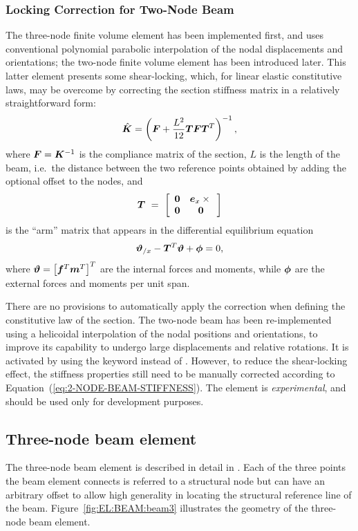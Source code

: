 \subsubsection{Locking Correction for Two-Node Beam}
The three-node finite volume element has been implemented first, 
and uses conventional polynomial parabolic interpolation 
of the nodal displacements and orientations;
the two-node finite volume element has been introduced later.
This latter element presents some shear-locking, which, for linear elastic
constitutive laws, may be overcome by correcting the section stiffness matrix
in a relatively straightforward form:
\begin{equation}\label{eq:2-NODE-BEAM-STIFFNESS}
	\hat{\T{K}} = \plbr{\T{F} + \frac{L^2}{12}\T{T} \T{F} \T{T}^T}^{-1} ,
\end{equation}
where $\T{F}=\T{K}^{-1}$ is the compliance matrix of the section, 
$L$ is the length of the beam, i.e.\ the distance between
the two reference points obtained by adding the optional offset 
to the nodes, and
\begin{displaymath}
	\T{T} \ = \ \sqbr{\matr{cc}{
		\T{0} & \T{e}_x \times{} \\
		\T{0} & \T{0}
	}}
\end{displaymath}
is the ``arm'' matrix that appears in the differential equilibrium equation
\begin{displaymath}
	\T{\vartheta}_{/x} - \T{T}^T\T{\vartheta} + \T{\phi} = 0
	,
\end{displaymath}
where $\T{\vartheta}=\sqbr{\T{f}^T \T{m}^T}^T$ are the internal forces
and moments, while $\T{\phi}$ are the external forces and moments
per unit span.

There are no provisions to automatically apply the correction 
when defining the constitutive law of the section.
The two-node beam has been re-implemented using a helicoidal interpolation
of the nodal positions and orientations, to improve its capability
to undergo large displacements and relative rotations.
It is activated by using the keyword  instead of .
However, to reduce the shear-locking effect, the stiffness properties 
still need to be manually corrected according
to Equation~(\ref{eq:2-NODE-BEAM-STIFFNESS}).
The  element is \emph{experimental}, and should be used
only for development purposes.


\subsection{Three-node beam element}
\label{sec:EL:BEAM:BEAM3}
The three-node beam element is described in detail in \cite{FV-AIAA}.
Each of the three points the beam element connects is referred
to a structural node but can have an arbitrary offset
to allow high generality in locating the structural reference line
of the beam.
Figure~\ref{fig:EL:BEAM:beam3} illustrates the geometry
of the three-node beam element.

